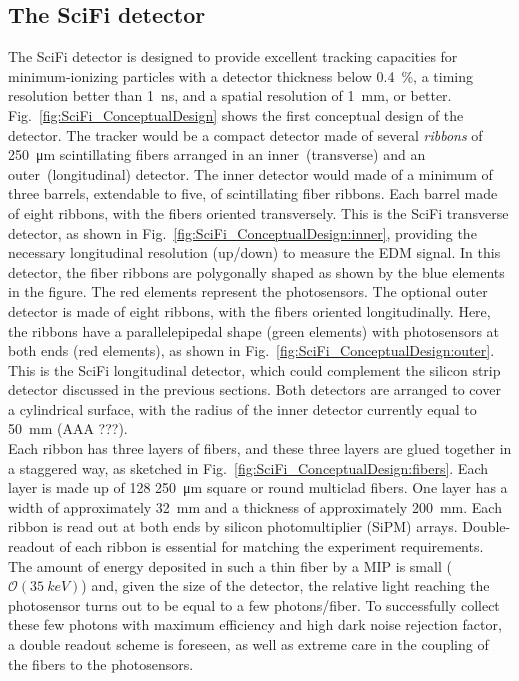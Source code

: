\begin{refsection}
    \subsection{The SciFi detector}
        The SciFi detector is designed to provide excellent tracking capacities for minimum-ionizing particles with a detector thickness below \SI{0.4}{\%}, a timing resolution better than \SI{1}{ns}, and a spatial resolution of \SI{1}{mm}, or better.
        Fig.~\ref{fig:SciFi_ConceptualDesign} shows the first conceptual design of the detector. 
        The tracker would be a compact detector made of several \textit{ribbons} of \SI{250}{\micro m} scintillating fibers arranged in an inner~(transverse) and an outer~(longitudinal) detector.
        The inner detector would made of a minimum of three barrels, extendable to five, of scintillating fiber ribbons. Each barrel made of eight ribbons, with the fibers oriented transversely. 
        This is the SciFi transverse detector, as shown in Fig.~\ref{fig:SciFi_ConceptualDesign:inner}, providing the necessary longitudinal resolution (up/down) to measure the EDM signal. 
        In this detector, the fiber ribbons are polygonally shaped as shown by the blue elements in the figure. The red elements represent the photosensors. 
        The optional outer detector is made of eight ribbons, with the fibers oriented longitudinally. Here, the ribbons have a parallelepipedal shape (green elements) with photosensors at both ends (red elements), as shown in Fig.~\ref{fig:SciFi_ConceptualDesign:outer}. 
        This is the SciFi longitudinal detector, which could complement the silicon strip detector discussed in the previous sections. 
        Both detectors are arranged to cover a cylindrical surface, with the radius of the inner detector currently equal to \SI{50}{mm} (AAA ???).\\
        
        \noindent
        Each ribbon has three layers of fibers, and these three layers are glued together in a staggered way, as sketched in Fig.~\ref{fig:SciFi_ConceptualDesign:fibers}. Each layer is made up of 128 \SI{250}{\micro m} square or round multiclad fibers. 
        One layer has a width of approximately \SI{32}{mm} and a thickness of approximately \SI{200}{mm}. 
        Each ribbon is read out at both ends by silicon photomultiplier (SiPM) arrays. 
        Double-readout of each ribbon is essential for matching the experiment requirements.
        The amount of energy deposited in such a thin fiber by a MIP is small ($\mathcal{O}(\SI{35}{keV})$) and, given the size of the detector, the relative light reaching the photosensor turns out to be equal to a few photons/fiber. 
        To successfully collect these few photons with maximum efficiency and high dark noise rejection factor, a double readout scheme is foreseen, as well as extreme care in the coupling of the fibers to the photosensors.


\end{refsection}

